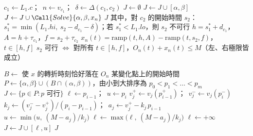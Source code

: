 \begin{algorithm}[htbp]
\caption{中繼節點的 Buffer 檢查}
\label{alg:relay}
\begin{algorithmic}[1]
  \State $c_1 \gets L_1.c$；\ $n \gets v_{c_1}$；\ $\delta \gets \Delta(c_1, c_2)$
  \State $J \gets \emptyset$
      \State $J \gets J \cup [\alpha, \beta]$ 
    \Else
      \State $J \gets J \cup \Call{Solve}{\alpha, \beta, x_n}$ 
    \EndIf
  \EndFor
  \State \Return $J$
\EndFunction
\Statex
\Statex 其中，對 $c_2$ 的開始時間 $s_2$：
\Statex \quad $s_1^\ast = \min(L_1.\mathit{hi},\ s_2 - d_{c_1} - \delta)$；若 $s_1^\ast < L_1.\mathit{lo}$，則 $s_2$ 不可行
\Statex \quad $h = s_1^\ast + d_{c_1}$，$A = h + \tau_{c_1}$，$f = s_2 + \tau_{c_2}$
\Statex \quad $x_n(t) = \mathrm{ramp}(t, h, A) - \mathrm{ramp}(t, s_2, f)$，\ $t \in [h, f]$
\Statex \quad $s_2$ 可行 $\iff$ 對所有 $t\in[h,f]$，$O_n(t) + x_n(t) \le M$（左、右極限皆成立）
\end{algorithmic}
\end{algorithm}

\begin{algorithm}[htbp]
\caption{在區間內求出所有可行的開始時間}
\label{alg:solve}
\begin{algorithmic}[1]
  \State $B \gets$ 使 $x$ 的轉折時刻恰好落在 $O_n$ 某變化點上的開始時間
  \State $P \gets \{\alpha, \beta\} \cup (B \cap (\alpha, \beta))$，由小到大排序為 $p_0 < p_1 < \dots < p_m$
  \State $J \gets \{p \in P : p \text{ 可行}\}$ 
    \State $\ell \gets p_{i-1}$；\ $u \gets p_i$
      \State $v_j^{+} \gets v_j(p_{i-1}^{+})$；\ $v_j^{-} \gets v_j(p_i^{-})$ 
      \State $k_j \gets (v_j^{-} - v_j^{+}) / (p_i - p_{i-1})$；\ $a_j \gets v_j^{+} - k_j\, p_{i-1}$ 
       \State $u \gets \min\bigl(u,\ (M - a_j)/k_j\bigr)$ 
       \State $\ell \gets \max\bigl(\ell,\ (M - a_j)/k_j\bigr)$ 
       \State $\ell \gets +\infty$ 
      \EndIf
    \EndFor
     \State $J \gets J \cup [\ell, u]$ \EndIf
  \EndFor
  \State \Return $J$
\EndFunction
\end{algorithmic}
\end{algorithm}

